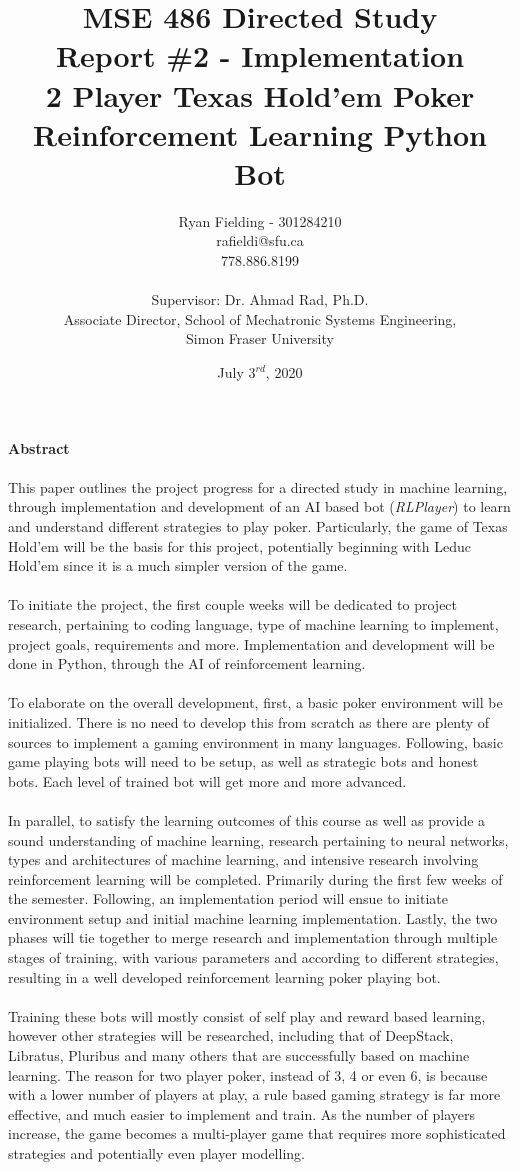 \documentclass[12pt]{article}
\title{MSE 486 Directed Study\\Report \#2 - Implementation\\ \bigskip \textbf{2 Player Texas Hold'em Poker\\Reinforcement Learning Python Bot}}
\author{Ryan Fielding - 301284210\\rafieldi@sfu.ca\\778.886.8199\\\\Supervisor: Dr. Ahmad Rad, Ph.D.\\Associate Director, School of Mechatronic Systems Engineering,\\Simon Fraser University}
\date{July $3^{rd}$, 2020}
\begin{document}
\maketitle
\newpage

{\Large \textbf{Abstract\\\\}}
This paper outlines the project progress for a directed study in machine learning, through implementation and development of an AI based bot (\textit{RLPlayer}) to learn and understand different strategies to play poker. Particularly, the game of Texas Hold'em will be the basis for this project, potentially beginning with Leduc Hold'em since it is a much simpler version of the game.\\\\
To initiate the project, the first couple weeks will be dedicated to project research, pertaining to coding language, type of machine learning to implement, project goals, requirements and more. Implementation and development will be done in Python, through the AI of reinforcement learning.\\\\
To elaborate on the overall development, first, a basic poker environment will be initialized. There is no need to develop this from scratch as there are plenty of sources to implement a gaming environment in many languages. Following, basic game playing bots will need to be setup, as well as strategic bots and honest bots. Each level of trained bot will get more and more advanced.\\\\
In parallel, to satisfy the learning outcomes of this course as well as provide a sound understanding of machine learning, research pertaining to neural networks, types and architectures of machine learning, and intensive research involving reinforcement learning will be completed. Primarily during the first few weeks of the semester. Following, an implementation period will ensue to initiate environment setup and initial machine learning implementation. Lastly, the two phases will tie together to merge research and implementation through multiple stages of training, with various parameters and according to different strategies, resulting in a well developed reinforcement learning poker playing bot.\\\\
Training these bots will mostly consist of self play and reward based learning, however other strategies will be researched, including that of DeepStack, Libratus, Pluribus and many others that are successfully based on machine learning. The reason for two player poker, instead of 3, 4 or even 6, is because with a lower number of players at play, a rule based gaming strategy is far more effective, and much easier to implement and train. As the number of players increase, the game becomes a multi-player game that requires more sophisticated strategies and potentially even player modelling.\\\\
\end{document}
